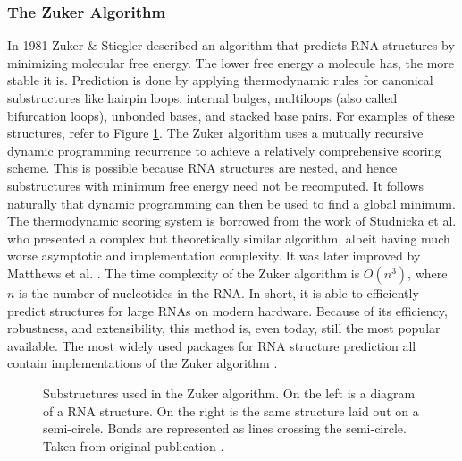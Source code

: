 \documentclass[12pt, a4paper]{article}
\begin{document}
\subsubsection{The Zuker Algorithm}
In 1981 Zuker \& Stiegler \cite{zuker1981optimal}
described an algorithm that predicts RNA structures by minimizing molecular free energy. The lower free energy a molecule has, the more stable it is. Prediction is done
by applying thermodynamic rules for canonical substructures like hairpin loops, internal bulges, multiloops (also called bifurcation loops), unbonded bases, and stacked base pairs. For examples of these structures, refer to Figure \ref{fig:zuk_struct}. The Zuker algorithm uses a mutually recursive dynamic programming recurrence to achieve a relatively comprehensive scoring scheme. This is possible because RNA structures are nested, and hence substructures with minimum free energy need not be recomputed. It follows naturally that dynamic programming can then be used to find a global minimum. The thermodynamic scoring system is borrowed from the work of Studnicka et al. \cite{studnicka1978computer} who presented a
complex but theoretically similar algorithm, albeit having
much worse asymptotic and implementation complexity. It was later improved by Matthews et al. \cite{mathews1999expanded, mathews2004incorporating}. The time complexity of the Zuker algorithm is $O(n^3)$, where $n$ is the number of nucleotides in the RNA. In short, it is able to efficiently predict structures for large RNAs on modern hardware.  Because of
its efficiency, robustness, and extensibility, this method is,
even today, still the most popular available. The most widely used packages for RNA structure prediction all contain implementations of the Zuker algorithm \cite{lorenz2011viennarna, reuter2010rnastructure}.

\begin{figure}
\begin{center}
\end{center}
\caption{Substructures used in the Zuker algorithm. On the left is a diagram of a RNA structure. On the right is the same structure laid out on a semi-circle. Bonds are represented as lines crossing the semi-circle. Taken from original
publication \cite{zuker1981optimal}.}
\label{fig:zuk_struct}
\end{figure}
\end{document}
